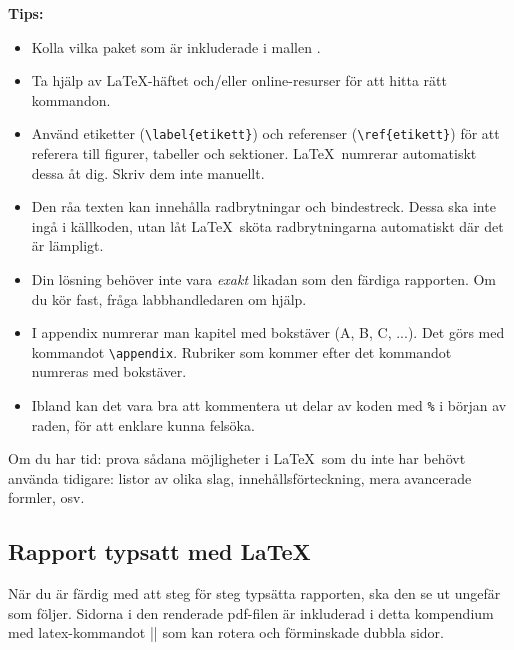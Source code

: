 \begin{Datorarbete}
  
    \noindent\textbf{Tips:}
    \begin{itemize}
        \item Kolla vilka paket som är inkluderade i mallen .
        \item Ta hjälp av \LaTeX-häftet och/eller online-resurser för att hitta rätt kommandon.
        \item Använd etiketter (\verb/\label{etikett}/) och referenser (\verb/\ref{etikett}/) för att referera till figurer, tabeller och sektioner. \LaTeX\ numrerar automatiskt dessa åt dig. Skriv dem inte manuellt.
        \item Den råa texten kan innehålla radbrytningar och bindestreck. Dessa ska inte ingå i källkoden, utan låt \LaTeX\ sköta radbrytningarna automatiskt där det är lämpligt.
        \item Din lösning behöver inte vara \emph{exakt} likadan som den färdiga rapporten. Om du kör fast, fråga labbhandledaren om hjälp.
        \item I appendix numrerar man kapitel med bokstäver (A, B, C, ...). Det görs med kommandot \verb/\appendix/. Rubriker som kommer efter det kommandot numreras med bokstäver.
		\item Ibland kan det vara bra att kommentera ut delar av koden med \verb/%/ i början av raden, för att enklare kunna felsöka.
    \end{itemize}

	\item Om du har tid: prova sådana möjligheter i \LaTeX\ som du inte har behövt använda tidigare: listor av olika slag, innehållsförteckning, mera avancerade formler, osv.
\end{Datorarbete}

\subsection{Rapport typsatt med \LaTeX}

När du är färdig med att steg för steg typsätta rapporten, ska den se ut ungefär som följer. Sidorna i den renderade pdf-filen är inkluderad i detta kompendium med latex-kommandot 
\code|| som kan rotera och förminskade dubbla sidor.




